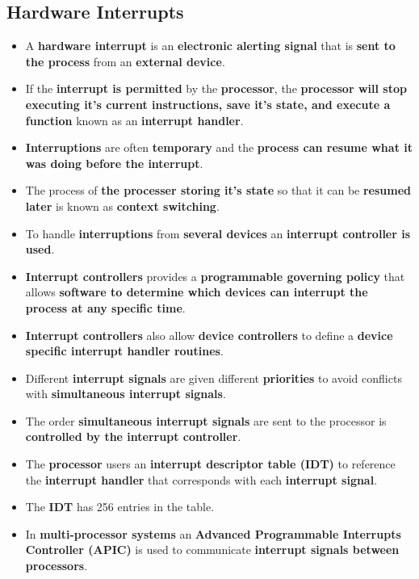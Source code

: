 \documentclass[16pt]{article}
\begin{document}
    \subsection*{Hardware Interrupts}
    \begin{itemize}
        \item A \textbf{hardware interrupt} is an \textbf{electronic alerting signal} that is \textbf{sent to the process} from an \textbf{external device}.
        \item If the \textbf{interrupt is permitted} by the \textbf{processor}, the \textbf{processor will stop executing it's current instructions, save it's state, and execute a function} known as an \textbf{interrupt handler}.
        \item \textbf{Interruptions} are often \textbf{temporary} and the \textbf{process can resume what it was doing before the interrupt}.
        \item The process of \textbf{the processer storing it's state} so that it can be \textbf{resumed later} is known as \textbf{context switching}.
        \item To handle \textbf{interruptions} from \textbf{several devices} an \textbf{interrupt controller is used}.
        \item \textbf{Interrupt controllers} provides a \textbf{programmable governing policy} that allows \textbf{software to determine which devices can interrupt the process at any specific time}.
        \item \textbf{Interrupt controllers} also allow \textbf{device controllers} to define a \textbf{device specific interrupt handler routines}.
        \item Different \textbf{interrupt signals} are given different \textbf{priorities} to avoid conflicts with \textbf{simultaneous interrupt signals}.
        \item The order \textbf{simultaneous interrupt signals} are sent to the processor is \textbf{controlled by the interrupt controller}.
        \item The \textbf{processor} users an \textbf{interrupt descriptor table (IDT)} to reference the \textbf{interrupt handler} that corresponds with each \textbf{interrupt signal}.
        \item The \textbf{IDT} has 256 entries in the table.
        \item In \textbf{multi-processor systems} an \textbf{Advanced Programmable Interrupts Controller (APIC)} is used to communicate \textbf{interrupt signals between processors}.
    \end{itemize}
\end{document}
